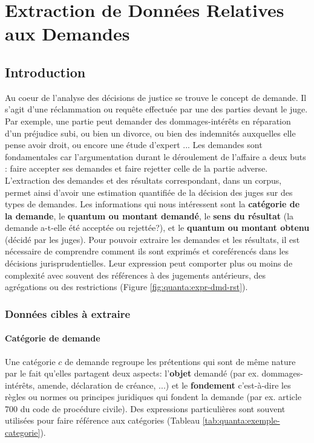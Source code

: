 %
\chapter{Extraction de Données Relatives aux Demandes}
\label{chap:quanta}

\section{Introduction}
\label{sec:quanta:introduction}
Au coeur de l'analyse des décisions de justice se trouve le concept de demande. Il s'agit d'une réclammation ou requête effectuée par une des parties devant le juge. Par exemple, une partie peut demander des dommages-intérêts en réparation d'un préjudice subi, ou bien un divorce, ou bien des indemnités auxquelles elle pense avoir droit, ou encore une étude d'expert ... Les demandes sont fondamentales car l'argumentation durant le déroulement de l'affaire a deux buts : faire accepter ses demandes et faire rejetter celle de la partie adverse. L'extraction des demandes et des résultats correspondant, dans un corpus, permet ainsi d'avoir une estimation quantifiée de la décision des juges sur des types de demandes. Les informations qui nous intéressent sont la \textbf{catégorie de la demande}, le \textbf{quantum ou montant demandé}, le \textbf{sens du résultat} (la demande a-t-elle été acceptée ou rejettée?), et le \textbf{quantum ou montant obtenu} (décidé par les juges). Pour pouvoir extraire les demandes et les résultats, il est nécessaire de comprendre comment ils sont exprimés et coreférencés dans les décisions jurisprudentielles. Leur expression peut comporter plus ou moins de complexité avec souvent des références à des jugements antérieurs, des agrégations ou des restrictions (Figure \ref{fig:quanta:expr-dmd-rst}).

\subsection{Données cibles à extraire}
\subsubsection{Catégorie de demande}
Une catégorie $c$ de demande regroupe les prétentions qui sont de même nature par le fait qu'elles partagent deux aspects: l'\textbf{objet} demandé (par ex. dommages-intérêts, amende, déclaration de créance, ...) et le \textbf{fondement} c'est-à-dire les règles ou normes ou principes juridiques qui fondent la demande (par ex. article 700 du code de procédure civile). Des expressions particulières sont souvent utilisées pour faire référence aux catégories (Tableau \ref{tab:quanta:exemple-categorie}).

